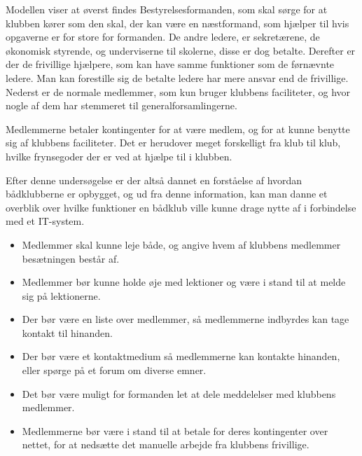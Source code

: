 Modellen viser at øverst findes Bestyrelsesformanden, som skal sørge for at klubben kører som den skal, der kan være en næstformand, som hjælper til hvis opgaverne er for store for formanden. De andre ledere, er sekretærene, de økonomisk styrende, og underviserne til skolerne, disse er dog betalte. Derefter er der de frivillige hjælpere, som kan have samme funktioner som de førnævnte ledere. Man kan forestille sig de betalte ledere har mere ansvar end de frivillige. Nederst er de normale medlemmer, som kun bruger klubbens faciliteter, og hvor nogle af dem har stemmeret til generalforsamlingerne.

Medlemmerne betaler kontingenter for at være medlem, og for at kunne benytte sig af klubbens faciliteter. Det er herudover meget forskelligt fra klub til klub, hvilke frynsegoder der er ved at hjælpe til i klubben.

Efter denne undersøgelse er der altså dannet en forståelse af hvordan bådklubberne er opbygget, og ud fra denne information, kan man danne et overblik over hvilke funktioner en bådklub ville kunne drage nytte af i forbindelse med et IT-system.


\begin{itemize}
	\item Medlemmer skal kunne leje både, og angive hvem af klubbens medlemmer besætningen består af.
	\item Medlemmer bør kunne holde øje med lektioner og være i stand til at melde sig på lektionerne.
	\item Der bør være en liste over medlemmer, så medlemmerne indbyrdes kan tage kontakt til hinanden.
	\item Der bør være et kontaktmedium så medlemmerne kan kontakte hinanden, eller spørge på et forum om diverse emner.
	\item Det bør være muligt for formanden let at dele meddelelser med klubbens medlemmer. 
	\item Medlemmerne bør være i stand til at betale for deres kontingenter over nettet, for at nedsætte det manuelle arbejde fra klubbens frivillige.
\end{itemize}
\cbend
